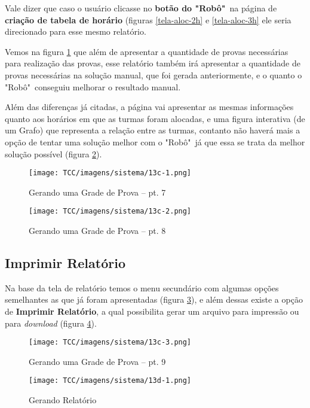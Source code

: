\begin{anexosenv}
Vale dizer que caso o usuário clicasse no \textbf{botão do "Robô"}\ na página de\textbf{ criação de tabela de horário} (figuras \ref{tela-aloc-2h} e \ref{tela-aloc-3h} ele seria direcionado para esse mesmo relatório.

Vemos na figura \ref{tela-grade7} que além de apresentar a quantidade de provas necessárias para realização das provas, esse relatório também irá apresentar a quantidade de provas necessárias na solução manual, que foi gerada anteriormente, e o quanto o "Robô"\ conseguiu melhorar o resultado manual. 

Além das diferenças já citadas, a página vai apresentar as mesmas informações quanto aos horários em que as turmas foram alocadas, e uma figura interativa (de um Grafo) que representa a relação entre as turmas, contanto não haverá mais a opção de tentar uma solução melhor com o "Robô"\ já que essa se trata da melhor solução possível (figura \ref{tela-grade8}).


\begin{figure}[H]
     \centering
     \texttt{[image: TCC/imagens/sistema/13c-1.png]}
     \caption{Gerando uma Grade de Prova -- pt. 7}
     \label{tela-grade7}
\end{figure}

\begin{figure}[H]
     \centering
     \texttt{[image: TCC/imagens/sistema/13c-2.png]}
     \caption{Gerando uma Grade de Prova -- pt. 8}
     \label{tela-grade8}
\end{figure}



\subsection{Imprimir Relatório}

Na base da tela de relatório temos o menu secundário com algumas opções semelhantes as que já foram apresentadas (figura \ref{tela-grade9}), e além dessas existe a opção de \textbf{Imprimir Relatório}, a qual possibilita gerar um arquivo para impressão ou para \textit{download} (figura \ref{tela-relatorio}).

\begin{figure}[H]
     \centering
     \texttt{[image: TCC/imagens/sistema/13c-3.png]}
     \caption{Gerando uma Grade de Prova -- pt. 9}
     \label{tela-grade9}
\end{figure}
\begin{figure}[H]
     \centering
     \texttt{[image: TCC/imagens/sistema/13d-1.png]}
     \caption{Gerando Relatório}
     \label{tela-relatorio}
\end{figure}




\end{anexosenv}

